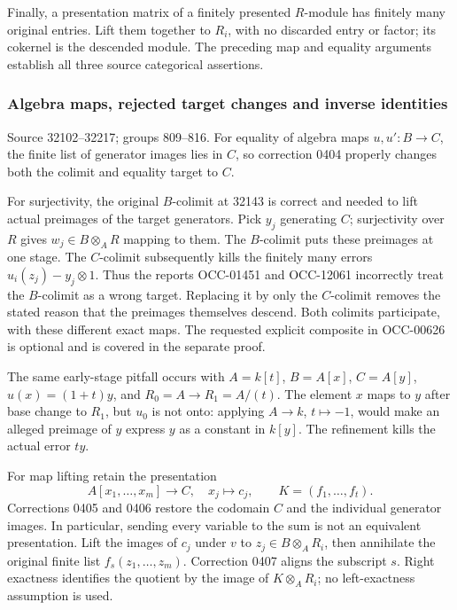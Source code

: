 Finally, a presentation matrix of a finitely presented \(R\)-module has finitely many original entries. Lift them together to \(R_i\), with no discarded entry or factor; its cokernel is the descended module. The preceding map and equality arguments establish all three source categorical assertions.

\subsubsection{Algebra maps, rejected target changes and inverse identities}\label{algebra-proof-036-algebra-maps-rejected-target-changes-and-inverse-identities}

Source 32102--32217; groups 809--816. For equality of algebra maps \(u,u':B\to C\), the finite list of generator images lies in \(C\), so correction 0404 properly changes both the colimit and equality target to \(C\).

For surjectivity, the original \(B\)-colimit at 32143 is correct and needed to lift actual preimages of the target generators. Pick \(y_j\) generating \(C\); surjectivity over \(R\) gives \(w_j\in B\otimes_A R\) mapping to them. The \(B\)-colimit puts these preimages at one stage. The \(C\)-colimit subsequently kills the finitely many errors \(u_i(z_j)-y_j\otimes1\). Thus the reports OCC-01451 and OCC-12061 incorrectly treat the \(B\)-colimit as a wrong target. Replacing it by only the \(C\)-colimit removes the stated reason that the preimages themselves descend. Both colimits participate, with these different exact maps. The requested explicit composite in OCC-00626 is optional and is covered in the separate proof.

The same early-stage pitfall occurs with \(A=k[t]\), \(B=A[x]\), \(C=A[y]\), \(u(x)=(1+t)y\), and \(R_0=A\to R_1=A/(t)\). The element \(x\) maps to \(y\) after base change to \(R_1\), but \(u_0\) is not onto: applying \(A\to k\), \(t\mapsto-1\), would make an alleged preimage of \(y\) express \(y\) as a constant in \(k[y]\). The refinement kills the actual error \(ty\).

For map lifting retain the presentation \[
A[x_1,\ldots,x_m]\longrightarrow C,\quad x_j\longmapsto c_j,
\qquad K=(f_1,\ldots,f_t).
\] Corrections 0405 and 0406 restore the codomain \(C\) and the individual generator images. In particular, sending every variable to the sum is not an equivalent presentation. Lift the images of \(c_j\) under \(v\) to \(z_j\in B\otimes_A R_i\), then annihilate the original finite list \(f_s(z_1,\ldots,z_m)\). Correction 0407 aligns the subscript \(s\). Right exactness identifies the quotient by the image of \(K\otimes_A R_i\); no left-exactness assumption is used.

